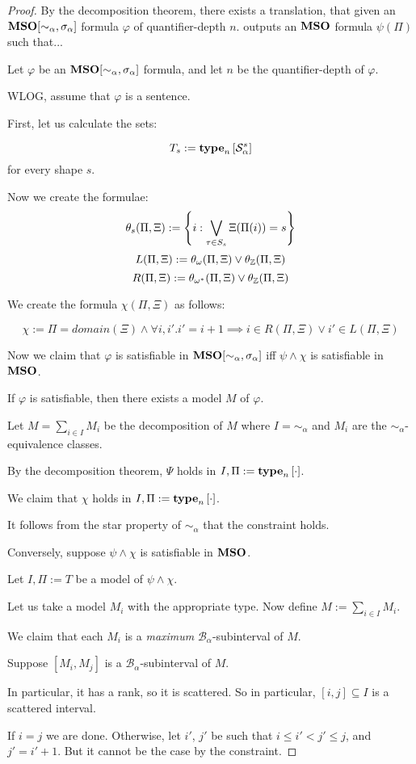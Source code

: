 \begin{proof}
  By the decomposition theorem, there exists a translation,
  that given an $\mathbf{MSO}[\sim_{\alpha}, \sigma_{\alpha}]$ formula $\varphi$ of quantifier-depth $n$.
  outputs an $\mathbf{MSO}$ formula $\psi(\Pi)$ such that...

  Let $\varphi$ be an $\mathbf{MSO}[\sim_{\alpha}, \sigma_{\alpha}]$ formula,
  and let $n$ be the quantifier-depth of $\varphi$.

  WLOG, assume that $\varphi$ is a sentence.

  First, let us calculate the sets:

  \[T_s := \mathbf{type}_{n} \left[ {\mathcal{S}^{s}_{\alpha}} \right]\]
  for every shape $s$.

  Now we create the formulae:
  \[\theta_s(\Pi, \Xi) := \left\{ {i : \bigvee_{\tau \in S_s}{\Xi(\Pi(i)) = s}} \right\}\]
  \[L(\Pi, \Xi) := \theta_{\omega}(\Pi, \Xi) \vee \theta_{\mathbb{Z}}(\Pi, \Xi)\]
  \[R(\Pi, \Xi) := \theta_{\omega^\ast}(\Pi, \Xi) \vee \theta_{\mathbb{Z}}(\Pi, \Xi)\]

  We create the formula $\chi(\Pi, \Xi)$ as follows:

  \[\chi := \Pi = domain(\Xi) \wedge \forall i, i'. i' = i + 1 \implies {i \in R(\Pi, \Xi) \vee i' \in L(\Pi, \Xi)}\]

  Now we claim that $\varphi$ is satisfiable in $\mathbf{MSO}[\sim_{\alpha}, \sigma_{\alpha}]$
  iff $\psi \land \chi$ is satisfiable in $\mathbf{MSO}$.

  If $\varphi$ is satisfiable, then there exists a model $M$ of $\varphi$.

  Let $M = \sum_{i \in I} M_i$ be the decomposition of $M$
  where $I = \sim_{\alpha}$ and $M_i$ are the $\sim_{\alpha}$-equivalence classes.

  By the decomposition theorem, $\Psi$ holds
  in $I, \Pi := \mathbf{type}_{n} \left[ {\cdot} \right]$.

  We claim that $\chi$ holds in $I, \Pi := \mathbf{type}_{n} \left[ {\cdot} \right]$.

  It follows from the star property of $\sim_{\alpha}$ that the constraint holds.

  Conversely, suppose $\psi \land \chi$ is satisfiable in $\mathbf{MSO}$.

  Let $I, \Pi := T$ be a model of $\psi \land \chi$.

  Let us take a model $M_i$ with the appropriate type.
  Now define $M := \sum_{i \in I} M_i$.

  We claim that each $M_i$ is a \emph{maximum} $\mathcal{B}_{\alpha}$-subinterval
  of $M$.

  Suppose $[M_i, M_j]$ is a $\mathcal{B}_{\alpha}$-subinterval of $M$.

  In particular, it has a rank, so it is scattered. So in particular,
  $[i, j] \subseteq I$ is a scattered interval.

  If $i = j$ we are done. Otherwise, let $i'$, $j'$ be such that $i \le i' < j' \le j$,
  and $j' = i' + 1$.  But it cannot be the case by the constraint.


\end{proof}

